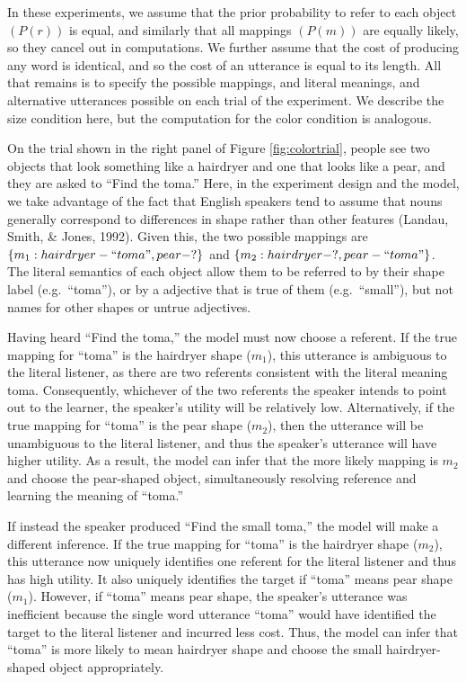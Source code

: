 \documentclass[
  english,
  man,floatsintext]{apa6}
\begin{document}
In these experiments, we assume that the prior probability to refer to each object \((P\left(r\right))\) is equal, and similarly that all mappings \((P\left(m\right))\) are equally likely, so they cancel out in computations. We further assume that the cost of producing any word is identical, and so the cost of an utterance is equal to its length. All that remains is to specify the possible mappings, and literal meanings, and alternative utterances possible on each trial of the experiment. We describe the size condition here, but the computation for the color condition is analogous.

On the trial shown in the right panel of Figure \ref{fig:colortrial}, people see two objects that look something like a hairdryer and one that looks like a pear, and they are asked to ``Find the toma.'' Here, in the experiment design and the model, we take advantage of the fact that English speakers tend to assume that nouns generally correspond to differences in shape rather than other features (Landau, Smith, \& Jones, 1992). Given this, the two possible mappings are \(\{m_1: hairdryer-``toma", pear-?\}\) and \(\{m_2: hairdryer-?, pear-``toma"\}\). The literal semantics of each object allow them to be referred to by their shape label (e.g.~``toma''), or by a adjective that is true of them (e.g.~``small''), but not names for other shapes or untrue adjectives.

Having heard ``Find the toma,'' the model must now choose a referent. If the true mapping for ``toma'' is the hairdryer shape (\(m_1\)), this utterance is ambiguous to the literal listener, as there are two referents consistent with the literal meaning toma. Consequently, whichever of the two referents the speaker intends to point out to the learner, the speaker's utility will be relatively low. Alternatively, if the true mapping for ``toma'' is the pear shape (\(m_2\)), then the utterance will be unambiguous to the literal listener, and thus the speaker's utterance will have higher utility. As a result, the model can infer that the more likely mapping is \(m_2\) and choose the pear-shaped object, simultaneously resolving reference and learning the meaning of ``toma.''

If instead the speaker produced ``Find the small toma,'' the model will make a different inference. If the true mapping for ``toma'' is the hairdryer shape (\(m_2\)), this utterance now uniquely identifies one referent for the literal listener and thus has high utility. It also uniquely identifies the target if ``toma'' means pear shape (\(m_1\)). However, if ``toma'' means pear shape, the speaker's utterance was inefficient because the single word utterance ``toma'' would have identified the target to the literal listener and incurred less cost. Thus, the model can infer that ``toma'' is more likely to mean hairdryer shape and choose the small hairdryer-shaped object appropriately.
\end{document}
